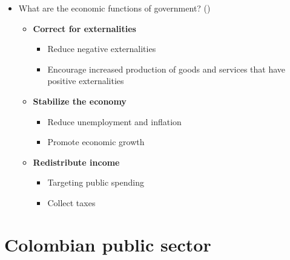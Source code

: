 \documentclass[
  ignorenonframetext,
  english,
]{beamer}
\providecommand{\tightlist}{%
  \setlength{\itemsep}{0pt}\setlength{\parskip}{0pt}}\usepackage{longtable,booktabs,array}
\begin{document}
\begin{frame}{}
\label{section-3}
\begin{itemize}
\item
  What are the economic functions of government?
  ()

  \begin{itemize}
  \item
    \textbf{Correct for externalities}

    \begin{itemize}
    \tightlist
    \item
      Reduce negative externalities
    \item
      Encourage increased production of goods and services that have
      positive externalities
    \end{itemize}
  \item
    \textbf{Stabilize the economy}

    \begin{itemize}
    \tightlist
    \item
      Reduce unemployment and inflation
    \item
      Promote economic growth
    \end{itemize}
  \item
    \textbf{Redistribute income}

    \begin{itemize}
    \tightlist
    \item
      Targeting public spending
    \item
      Collect taxes
    \end{itemize}
  \end{itemize}
\end{itemize}
\end{frame}

\section{Colombian public sector}\label{colombian-public-sector}
\end{document}
